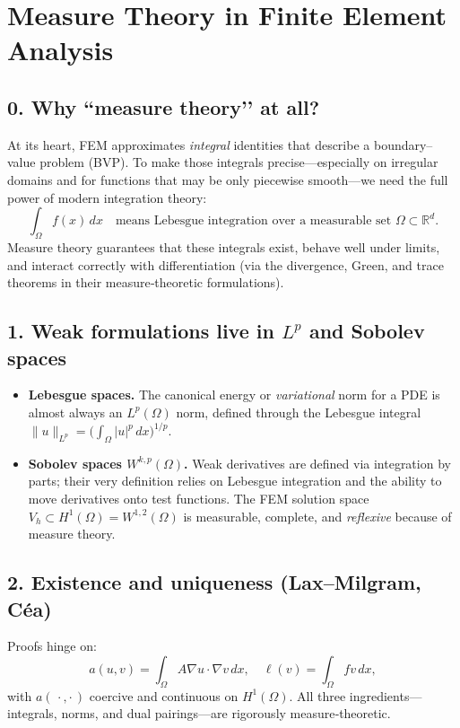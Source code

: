 \documentclass[12pt]{article}
\title{}
\author{Jerich Lee}
\date{\today}
\theoremstyle{definition} %
\theoremstyle{plain} %
\begin{document}
\maketitle
\section*{Measure Theory in Finite Element Analysis}

\subsection*{0.  Why ``measure theory’’ at all?}
At its heart, FEM approximates \emph{integral} identities that describe a
boundary–value problem (BVP).  
To make those integrals precise—especially on irregular domains and for
functions that may be only piecewise smooth—we need the full power of modern
integration theory:
\[
	\int_\Omega f(x)\,dx 
	\quad\text{means Lebesgue integration over a measurable set }
	\Omega\subset\mathbb{R}^d .
\]
Measure theory guarantees that these integrals exist, behave well under
limits, and interact correctly with differentiation (via the divergence,
Green, and trace theorems in their measure‑theoretic formulations).

\subsection*{1.  Weak formulations live in $L^p$ and Sobolev spaces}
\begin{itemize}
	\item \textbf{Lebesgue spaces.}
		The canonical energy or \emph{variational} norm for a PDE is almost
		always an $L^p(\Omega)$ norm, defined through the Lebesgue integral
		\(
			\|u\|_{L^p} = \bigl(\int_\Omega |u|^p\,dx\bigr)^{\!1/p}.
		\)
	\item \textbf{Sobolev spaces $W^{k,p}(\Omega)$.}
		Weak derivatives are defined via integration by parts; their very
		definition relies on Lebesgue integration and the ability to move
		derivatives onto test functions.  The FEM solution space
		$V_h\subset H^1(\Omega)=W^{1,2}(\Omega)$ is measurable,
		complete, and \emph{reflexive} because of measure theory.
\end{itemize}

\subsection*{2.  Existence and uniqueness (Lax–Milgram, Céa)}
Proofs hinge on:
\[
	a(u,v)=\int_\Omega A\nabla u\!\cdot\!\nabla v\,dx ,
	\quad
	\ell(v)=\int_\Omega fv\,dx ,
\]
with $a(\,\cdot\!,\cdot\,)$ coercive and continuous on $H^1(\Omega)$.
All three ingredients—integrals, norms, and dual pairings—are rigorously
measure‑theoretic.
\end{document}
